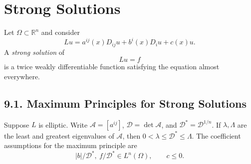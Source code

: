 \chapter{Strong Solutions}

Let $\Omega\subset\mathbb R^n$ and consider
\begin{equation}\tag{9.1}
Lu=a^{ij}(x)D_{ij}u+b^i(x)D_i u+c(x)u.
\end{equation}
A \emph{strong solution} of
\begin{equation}\tag{9.2}
Lu=f
\end{equation}
is a twice weakly differentiable function satisfying the equation almost
everywhere.

\section*{9.1. Maximum Principles for Strong Solutions}

Suppose $L$ is elliptic.  Write
$\mathcal A=[a^{ij}]$, $\mathcal D=\det\mathcal A$, and
$\mathcal D^*=\mathcal D^{1/n}$.  If $\lambda,\Lambda$ are the least and
greatest eigenvalues of $\mathcal A$, then
$0<\lambda\le\mathcal D^*\le\Lambda$.  The coefficient assumptions for the
maximum principle are
\begin{equation}\tag{9.3}
|b|/\mathcal D^*,\ f/\mathcal D^*\in L^n(\Omega),
\qquad c\le0.
\end{equation}


